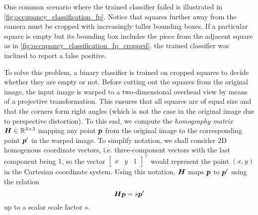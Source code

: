 \documentclass[../main.tex]{subfiles}
\begin{document}
One common scenario where the trained classifier failed is illustrated in \cref{fig:occupancy_classification_fp}.
Notice that squares further away from the camera must be cropped with increasingly taller bounding boxes.
If a particular square is empty but its bounding box includes the piece from the adjacent square as in \cref{fig:occupancy_classification_fp_cropped}, the trained classifier was inclined to report a false positive.

To solve this problem, a binary classifier is trained on cropped squares to decide whether they are empty or not.
Before cutting out the squares from the original image, the input image is warped to a two-dimensional overhead view by means of a projective transformation.
This ensures that all squares are of equal size and that the corners form right angles (which is not the case in the original image due to perspective distortion).
To this end, we compute the \emph{homography matrix} ${\bm{H}} \in \mathbb{R}^{3 \times 3}$ \cite{szeliski2011} mapping any point
${\bm{p}}$
from the original image to
the corresponding point
${\bm{p}}'$
in the warped image.
To simplify notation, we shall consider 2D homogenous coordinate vectors, i.e. three-component vectors with the last component being $1$, so the vector
$\begin{bmatrix}
    x & y & 1
\end{bmatrix}^\top$
would represent the point $(x,y)$ in the Cartesian coordinate system.
Using this notation, ${\bm{H}}$ maps ${\bm{p}}$ to ${\bm{p}}'$ using the relation
\begin{equation}
    \label{eq:homography_matrix_relation}
    {\bm{H}}
    {\bm{p}}
    = s {\bm{p}}'
\end{equation}
up to a scalar scale factor $s$.
\end{document}
